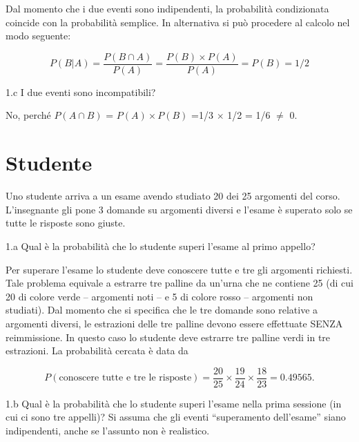 \documentclass[
  11pt,
]{book}
\theoremstyle{mytheoremstyle}
\theoremstyle{mydefstyle}
\newenvironment{sol}
  {
  \begin{tcolorbox}[enhanced,breakable,arc=0.1mm,boxrule=1pt,colback=white,colframe=iblue,
  title=\bf \fontfamily{lmss}\selectfont \hspace{.5 cm} Soluzione,drop fuzzy shadow]

}{
\end{tcolorbox}
  }
\begin{document}
\begin{sol}
Dal momento che i due eventi sono indipendenti, la probabilità
condizionata coincide con la probabilità semplice.
In alternativa si può procedere al calcolo nel modo seguente:

\[P({B}|A)= \frac{P(B \cap A)}{P(A)} = \frac{P(B) \times P(A)}{P(A)} = P({B}) =1/2\]

\end{sol}

1.c I due eventi sono incompatibili?

\begin{sol}
No, perché \({P(A \cap B)}\) = \({P(A) \times P(B)}\) =1/3 \(\times\) 1/2 = 1/6 \(\neq\) 0.

\end{sol}

\section{Studente}\label{studente}

Uno studente arriva a un esame avendo studiato 20 dei 25
argomenti del corso.
L'insegnante gli pone 3 domande su argomenti diversi e
l'esame è superato solo se tutte le risposte sono giuste.

1.a Qual è la probabilità che lo studente
superi l'esame al primo appello?

\begin{sol}
Per superare l'esame lo studente deve conoscere tutte e
tre gli argomenti richiesti.
Tale problema equivale a estrarre tre palline da un'urna
che ne contiene 25 (di cui 20 di colore verde -- argomenti noti --
e 5 di colore rosso -- argomenti non studiati).
Dal momento che si specifica che le tre domande sono relative a
argomenti diversi, le estrazioni delle tre palline devono essere
effettuate SENZA reimmissione.
In questo caso lo studente deve estrarre
tre palline verdi in tre estrazioni.
La probabilità cercata è data da

\[
P(\mbox{conoscere tutte e tre le risposte})=
\frac{20}{25} \times \frac{19}{24} \times \frac{18}{23} = 0.49565  .
\]

\end{sol}

1.b Qual è la probabilità che lo studente superi
l'esame nella prima sessione (in cui ci sono tre appelli)?
Si assuma che gli eventi ``superamento dell'esame'' siano
indipendenti, anche se l'assunto non è realistico.
\end{document}
